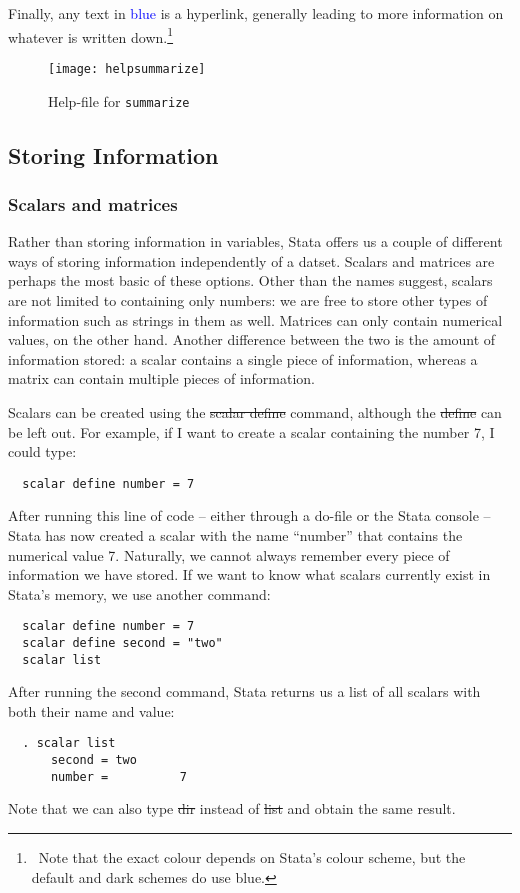 Finally, any text in \textcolor{blue}{blue} is a hyperlink,
generally leading to more information on whatever is written down.\footnote{~Note that the exact colour depends on Stata's colour scheme, but the default and dark schemes do use blue.}

\begin{figure}[tbp]\centering
  \caption{Help-file for \texttt{summarize}}\label{fig:hlpsum}
  \vspace{1ex}
  \texttt{[image: helpsummarize]}
\end{figure}

\subsection{Storing Information}

\subsubsection{Scalars and matrices}

Rather than storing information in variables,
Stata offers us a couple of different ways of storing information independently of a datset.
Scalars and matrices are perhaps the most basic of these options.
Other than the names suggest, scalars are not limited to containing only numbers:
we are free to store other types of information such as strings in them as well.
Matrices can only contain numerical values, on the other hand.
Another difference between the two is the amount of information stored:
a scalar contains a single piece of information,
whereas a matrix can contain multiple pieces of information.

Scalars can be created using the \st{scalar define} command,
although the \st{define} can be left out.
For example,
if I want to create a scalar containing the number 7,
I could type:
\begin{verbatim}
  scalar define number = 7
\end{verbatim}

After running this line of code -- either through a do-file or the Stata console -- Stata has now created a scalar with the name ``number'' that contains the numerical value 7.
Naturally, we cannot always remember every piece of information we have stored.
If we want to know what scalars currently exist in Stata's memory, we use another command:
\begin{verbatim}
  scalar define number = 7
  scalar define second = "two"
  scalar list
\end{verbatim}
After running the second command, Stata returns us a list of all scalars with both their name and value:
\small\begin{verbatim}
  . scalar list
      second = two
      number =          7
\end{verbatim}\normalsize
Note that we can also type \st{dir} instead of \st{list} and obtain the same result.

